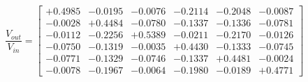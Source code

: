 \[
\frac{V_{out}}{V_{in}} = \begin{bmatrix}
  +0.4985 &   -0.0195 &   -0.0076 &   -0.2114 &   -0.2048 &   -0.0087 \\
  -0.0028 &   +0.4484 &   -0.0780 &   -0.1337 &   -0.1336 &   -0.0781 \\
  -0.0112 &   -0.2256 &   +0.5389 &   -0.0211 &   -0.2170 &   -0.0126 \\
  -0.0750 &   -0.1319 &   -0.0035 &   +0.4430 &   -0.1333 &   -0.0745 \\
  -0.0771 &   -0.1329 &   -0.0746 &   -0.1337 &   +0.4481 &   -0.0024 \\
  -0.0078 &   -0.1967 &   -0.0064 &   -0.1980 &   -0.0189 &   +0.4771
\end{bmatrix}
\]
